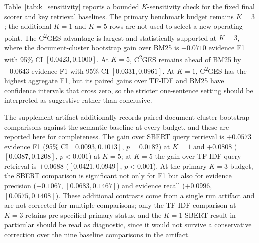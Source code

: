 \documentclass{ieeeaccess}
\begin{document}
Table~\ref{tab:k_sensitivity} reports a bounded \(K\)-sensitivity check for the fixed final scorer and key retrieval baselines. The primary benchmark budget remains \(K=3\); the additional \(K=1\) and \(K=5\) rows are not used to select a new operating point. The C\textsuperscript{2}GES advantage is largest and statistically supported at \(K=3\), where the document-cluster bootstrap gain over BM25 is \(+0.0710\) evidence F1 with 95\% CI \([0.0423,0.1000]\). At \(K=5\), C\textsuperscript{2}GES remains ahead of BM25 by \(+0.0643\) evidence F1 with 95\% CI \([0.0331,0.0961]\). At \(K=1\), C\textsuperscript{2}GES has the highest aggregate F1, but its paired gains over TF-IDF and BM25 have confidence intervals that cross zero, so the stricter one-sentence setting should be interpreted as suggestive rather than conclusive.

The supplement artifact additionally records paired document-cluster bootstrap comparisons against the semantic baseline at every budget, and these are reported here for completeness. The gain over SBERT query retrieval is \(+0.0573\) evidence F1 (95\% CI \([0.0093, 0.1013]\), \(p=0.0182\)) at \(K=1\) and \(+0.0808\) (\([0.0387, 0.1208]\), \(p<0.001\)) at \(K=5\); at \(K=5\) the gain over TF-IDF query retrieval is \(+0.0688\) (\([0.0421, 0.0949]\), \(p<0.001\)). At the primary \(K=3\) budget, the SBERT comparison is significant not only for F1 but also for evidence precision (\(+0.1067\), \([0.0683, 0.1467]\)) and evidence recall (\(+0.0996\), \([0.0575, 0.1408]\)). These additional contrasts come from a single run artifact and are not corrected for multiple comparisons; only the TF-IDF comparison at \(K=3\) retains pre-specified primary status, and the \(K=1\) SBERT result in particular should be read as diagnostic, since it would not survive a conservative correction over the nine baseline comparisons in the artifact.

\begin{table}[ht]
\centering
\caption{Role-stratified evidence-F1 effect of role-selective graph consistency}
\label{tab:role_graph_delta}
\end{table}
\end{document}

